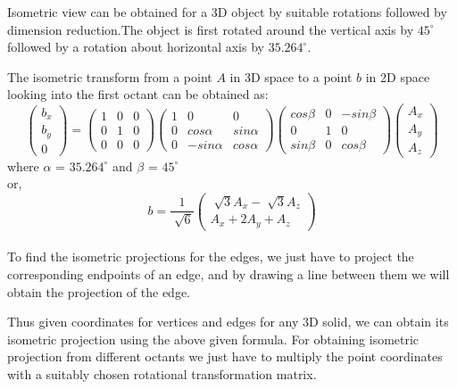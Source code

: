 \documentclass[a4paper,11pt,openany]{book}
\begin{document}
Isometric view can be obtained for a 3D object by suitable rotations followed by dimension reduction.The object is first rotated around the vertical axis by $45^{\circ}$ followed by a rotation about horizontal axis by $35.264^{\circ}$.

The isometric transform from a point $A$ in 3D space to a point $b$ in 2D space looking into the first octant can be obtained as:
\begin{equation}
\left(\begin{array}{c} b_x \\ b_y \\ 0 \end{array}\right) = \left(\begin{array}{ccc} 1 & 0 & 0 \\ 0 & 1 & 0 \\ 0 & 0 & 0 \end{array}\right)\left(\begin{array}{ccc} 1 & 0 & 0 \\ 0 & cos \alpha & sin \alpha \\ 0 & -sin \alpha & cos \alpha \end{array}\right)\left(\begin{array}{ccc} cos \beta & 0 & -sin \beta \\ 0 & 1 & 0 \\ sin \beta & 0 & cos \beta \end{array}\right)\left(\begin{array}{c} A_x  \\ A_y \\ A_z \end{array}\right)
\end{equation}
where $\alpha$ = $35.264^{\circ}$ and $\beta$ = $45^{\circ}$\\

or, 
\begin{equation}
b = \frac{1}{\sqrt[]{6}}\left(\begin{array}{c} \sqrt[]{3}A_x - \sqrt[]{3}A_z \\ A_x + 2A_y + A_z \end{array}\right)
\end{equation}\\

To find the isometric projections for the edges, we just have to project the corresponding endpoints of an edge, and by drawing a line between them we will obtain the projection of the edge.

Thus given coordinates for vertices and edges for any 3D solid, we can obtain its isometric projection using the above given formula. For obtaining isometric projection from different octants we just have to multiply the point coordinates with a suitably chosen rotational transformation matrix.
\appendix
\end{document}
